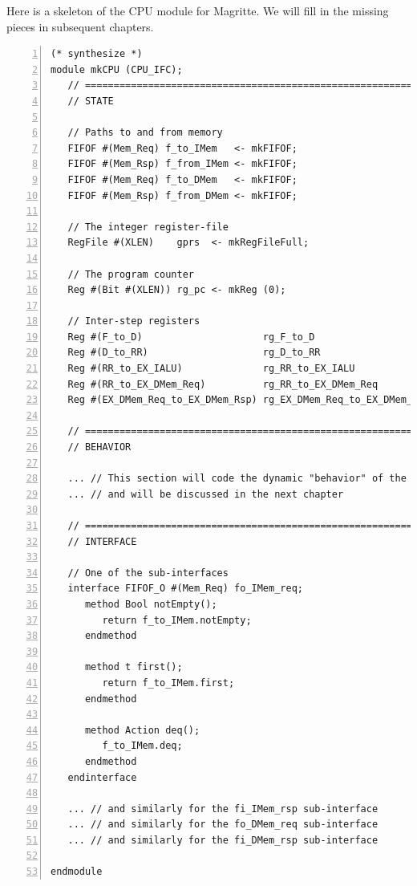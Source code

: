 \label{Sec_CPU_Module_Skeleton_skeleton_CPU_module}


Here is a skeleton of the CPU module for Magritte.  We will fill in
the missing pieces in subsequent chapters.

\begin{Verbatim}[frame=single, numbers=left]
(* synthesize *)
module mkCPU (CPU_IFC);
   // ================================================================
   // STATE

   // Paths to and from memory
   FIFOF #(Mem_Req) f_to_IMem   <- mkFIFOF;
   FIFOF #(Mem_Rsp) f_from_IMem <- mkFIFOF;
   FIFOF #(Mem_Req) f_to_DMem   <- mkFIFOF;
   FIFOF #(Mem_Rsp) f_from_DMem <- mkFIFOF;

   // The integer register-file
   RegFile #(XLEN)    gprs  <- mkRegFileFull;

   // The program counter
   Reg #(Bit #(XLEN)) rg_pc <- mkReg (0);

   // Inter-step registers
   Reg #(F_to_D)                     rg_F_to_D                  <- mkRegU;
   Reg #(D_to_RR)                    rg_D_to_RR                 <- mkRegU;
   Reg #(RR_to_EX_IALU)              rg_RR_to_EX_IALU           <- mkRegU;
   Reg #(RR_to_EX_DMem_Req)          rg_RR_to_EX_DMem_Req       <- mkRegU;
   Reg #(EX_DMem_Req_to_EX_DMem_Rsp) rg_EX_DMem_Req_to_EX_DMem_Rsp <- mkRegU;

   // ================================================================
   // BEHAVIOR

   ... // This section will code the dynamic "behavior" of the module
   ... // and will be discussed in the next chapter

   // ================================================================
   // INTERFACE

   // One of the sub-interfaces
   interface FIFOF_O #(Mem_Req) fo_IMem_req;
      method Bool notEmpty();
         return f_to_IMem.notEmpty;
      endmethod

      method t first();
         return f_to_IMem.first;
      endmethod

      method Action deq();
         f_to_IMem.deq;
      endmethod
   endinterface

   ... // and similarly for the fi_IMem_rsp sub-interface
   ... // and similarly for the fo_DMem_req sub-interface
   ... // and similarly for the fi_DMem_rsp sub-interface

endmodule

\end{Verbatim}

